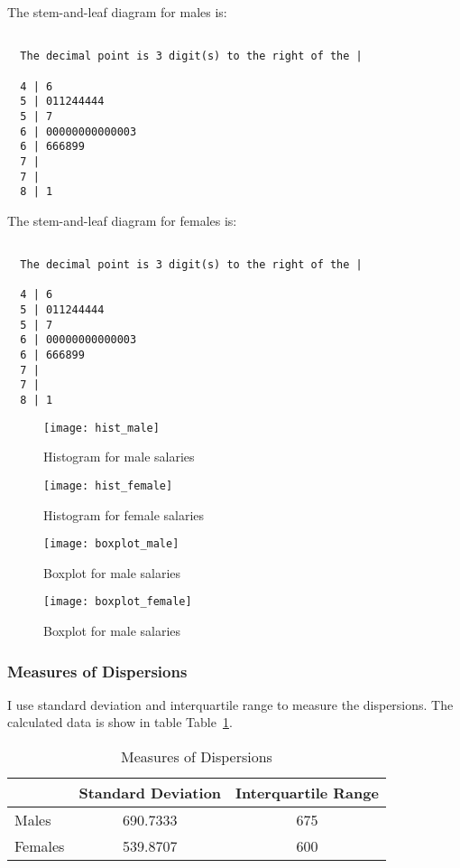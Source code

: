 \documentclass{article}
\begin{document}
The stem-and-leaf diagram for males is:
\begin{verbatim}

  The decimal point is 3 digit(s) to the right of the |

  4 | 6
  5 | 011244444
  5 | 7
  6 | 00000000000003
  6 | 666899
  7 | 
  7 | 
  8 | 1

\end{verbatim}

The stem-and-leaf diagram for females is:
\begin{verbatim}

  The decimal point is 3 digit(s) to the right of the |

  4 | 6
  5 | 011244444
  5 | 7
  6 | 00000000000003
  6 | 666899
  7 | 
  7 | 
  8 | 1

\end{verbatim}

\begin{figure}[ht!]
  \centering
  \texttt{[image: hist\_male]}
  \caption{Histogram for male salaries \label{fig:histm}}
\end{figure}


\begin{figure}[ht!]
  \centering
  \texttt{[image: hist\_female]}
  \caption{Histogram for female salaries \label{fig:histf}}
\end{figure}


\begin{figure}[ht!]
  \centering
  \texttt{[image: boxplot\_male]}
  \caption{Boxplot for male salaries\label{fig:boxm}}
\end{figure}

\begin{figure}[ht!]
  \centering
  \texttt{[image: boxplot\_female]}
  \caption{Boxplot for male salaries\label{fig:boxf}}
\end{figure}

\subsubsection{Measures of Dispersions}
I use standard deviation and interquartile range to measure the
dispersions. The calculated data is show in table Table~\ref{tab:md}.

\begin{table}[ht!]
  \begin{center}
    \begin{tabular}{|l|c|c|}
                                                                 \hline
               &  Standard Deviation &  Interquartile Range   \\ \hline
      Males    &  690.7333           &    675                 \\ \hline
      Females  &  539.8707           &    600                 \\ \hline
    \end{tabular}
  \end{center}
  \caption{Measures of Dispersions \label{tab:md}}
\end{table}
\end{document}
